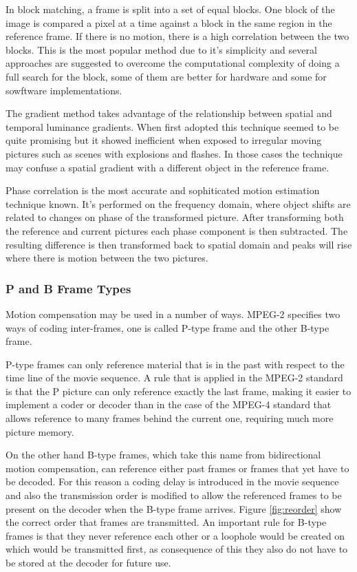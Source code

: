 \documentclass[a4paper, 12pt]{article}
\begin{document}
In block matching, a frame is split into a set of equal blocks. One block of the image is compared a pixel at a time against a block in the same region in the reference frame. If there is no motion, there is a high correlation between the two blocks. This is the most popular method due to it's simplicity and several approaches \cite{motionfss} \cite{motiontss} \cite{motionvlsi} \cite{motionhexagon} are suggested to overcome the computational complexity of doing a full search for the block, some of them are better for hardware and some for sowftware implementations.

The gradient method takes advantage of the relationship between spatial and temporal luminance gradients. When first adopted this technique seemed to be quite promising but it showed inefficient when exposed to irregular moving pictures such as scenes with explosions and flashes. In those cases the technique may confuse a spatial gradient with a different object in the reference frame.

Phase correlation is the most accurate and sophiticated motion estimation technique known. It's performed on the frequency domain, where object shifts are related to changes on phase of the transformed picture. After transforming both the reference and current pictures each phase component is then subtracted. The resulting difference is then transformed back to spatial domain and peaks will rise where there is motion between the two pictures.

\subsubsection{P and B Frame Types}
	
	Motion compensation may be used in a number of ways. MPEG-2 specifies two ways of coding inter-frames, one is called P-type frame and the other B-type frame.

	P-type frames can only reference material that is in the past with respect to the time line of the movie sequence. A rule that is applied in the MPEG-2 standard is that the P picture can only reference exactly the last frame, making it easier to implement a coder or decoder than in the case of the MPEG-4 standard that allows reference to many frames behind the current one, requiring much more picture memory.
	
	On the other hand B-type frames, which take this name from bidirectional motion compensation, can reference either past frames or frames that yet have to be decoded. For this reason a coding delay is introduced in the movie sequence and also the transmission order is modified to allow the referenced frames to be present on the decoder when the B-type frame arrives. Figure \ref{fig:reorder} show the correct order that frames are transmitted. An important rule for B-type frames is that they never reference each other or a loophole would be created on which would be transmitted first, as consequence of this they also do not have to be stored at the decoder for future use.
\end{document}

